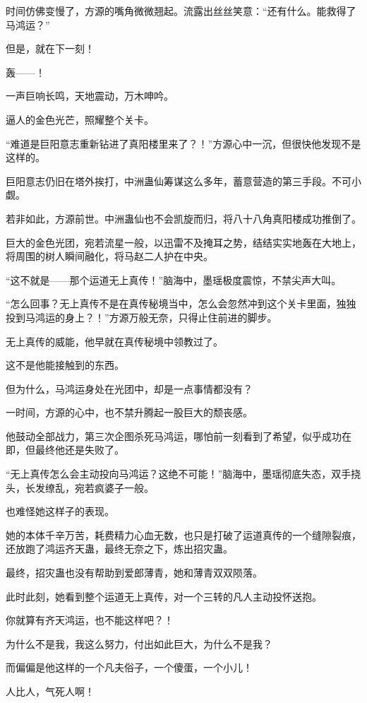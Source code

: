 \begin{this_body}
时间仿佛变慢了，方源的嘴角微微翘起。流露出丝丝笑意：“还有什么。能救得了马鸿运？”

但是，就在下一刻！

轰——！

一声巨响长鸣，天地震动，万木呻吟。

逼人的金色光芒，照耀整个关卡。

“难道是巨阳意志重新钻进了真阳楼里来了？！”方源心中一沉，但很快他发现不是这样的。

巨阳意志仍旧在塔外挨打，中洲蛊仙筹谋这么多年，蓄意营造的第三手段。不可小觑。

若非如此，方源前世。中洲蛊仙也不会凯旋而归，将八十八角真阳楼成功推倒了。

巨大的金色光团，宛若流星一般，以迅雷不及掩耳之势，结结实实地轰在大地上，将周围的树人瞬间融化，将马赵二人护在中央。

“这不就是——那个运道无上真传！”脑海中，墨瑶极度震惊，不禁尖声大叫。

“怎么回事？无上真传不是在真传秘境当中，怎么会忽然冲到这个关卡里面，独独投到马鸿运的身上？！”方源万般无奈，只得止住前进的脚步。

无上真传的威能，他早就在真传秘境中领教过了。

这不是他能接触到的东西。

但为什么，马鸿运身处在光团中，却是一点事情都没有？

一时间，方源的心中，也不禁升腾起一股巨大的颓丧感。

他鼓动全部战力，第三次企图杀死马鸿运，哪怕前一刻看到了希望，似乎成功在即，但最终他还是失败了。

“无上真传怎么会主动投向马鸿运？这绝不可能！”脑海中，墨瑶彻底失态，双手挠头，长发缭乱，宛若疯婆子一般。

也难怪她这样子的表现。

她的本体千辛万苦，耗费精力心血无数，也只是打破了运道真传的一个缝隙裂痕，还放跑了鸿运齐天蛊，最终无奈之下，炼出招灾蛊。

最终，招灾蛊也没有帮助到爱郎薄青，她和薄青双双陨落。

此时此刻，她看到整个运道无上真传，对一个三转的凡人主动投怀送抱。

你就算有齐天鸿运，也不能这样吧？！

为什么不是我，我这么努力，付出如此巨大，为什么不是我？

而偏偏是他这样的一个凡夫俗子，一个傻蛋，一个小儿！

人比人，气死人啊！


\end{this_body}
